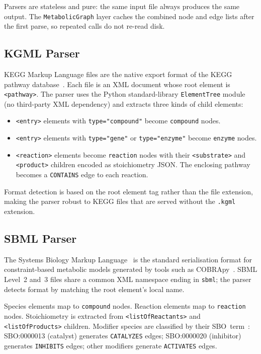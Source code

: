 \documentclass[10pt]{article}
\begin{document}
Parsers are stateless and pure: the same input file always produces the same
output. The \texttt{MetabolicGraph} layer caches the combined node and edge
lists after the first parse, so repeated calls do not re-read disk.

\subsection{KGML Parser}

KEGG Markup Language files are the native export format of the KEGG pathway
database~\citep{kanehisa2021kegg}. Each file is an XML
document whose root element is \texttt{<pathway>}. The parser uses the Python
standard-library \texttt{ElementTree} module (no third-party XML dependency)
and extracts three kinds of child elements:

\begin{itemize}[leftmargin=*,itemsep=2pt]
  \item \texttt{<entry>} elements with \texttt{type="compound"} become
    \texttt{compound} nodes.
  \item \texttt{<entry>} elements with \texttt{type="gene"} or
    \texttt{type="enzyme"} become \texttt{enzyme} nodes.
  \item \texttt{<reaction>} elements become \texttt{reaction} nodes with
    their \texttt{<substrate>} and \texttt{<product>} children encoded as
    stoichiometry JSON. The enclosing pathway becomes a \texttt{CONTAINS} edge
    to each reaction.
\end{itemize}

Format detection is based on the root element tag rather than the file
extension, making the parser robust to KEGG files that are served without
the \texttt{.kgml} extension.

\subsection{SBML Parser}

The Systems Biology Markup Language~\citep{keating2020sbml}
is the standard serialisation format for constraint-based metabolic models
generated by tools such as COBRApy~\citep{ebrahim2013cobrapy}. SBML Level~2
and~3 files share a common XML namespace ending in \texttt{sbml}; the parser
detects format by matching the root element's local name.

Species elements map to \texttt{compound} nodes. Reaction elements map to
\texttt{reaction} nodes. Stoichiometry is extracted from
\texttt{<listOfReactants>} and \texttt{<listOfProducts>} children.
Modifier species are classified by their SBO~term~\citep{courtot2011sbo}:
SBO:0000013 (catalyst) generates \texttt{CATALYZES} edges; SBO:0000020
(inhibitor) generates \texttt{INHIBITS} edges; other modifiers generate
\texttt{ACTIVATES} edges.
\end{document}
